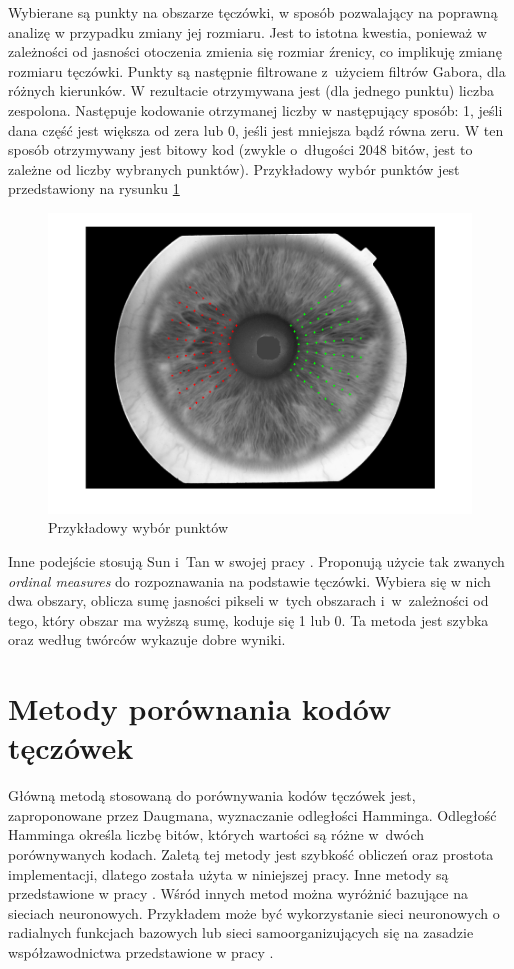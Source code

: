 Wybierane są punkty na obszarze tęczówki, w sposób pozwalający na poprawną analizę w przypadku zmiany jej rozmiaru. Jest to istotna kwestia, ponieważ w zależności od jasności otoczenia zmienia się rozmiar źrenicy, co implikuję zmianę rozmiaru tęczówki. Punkty są następnie filtrowane z~użyciem filtrów Gabora, dla różnych kierunków. W rezultacie otrzymywana jest (dla jednego punktu) liczba zespolona. Następuje kodowanie otrzymanej liczby w następujący sposób: 1, jeśli dana część jest większa od zera lub 0, jeśli jest mniejsza bądź równa zeru. W ten sposób otrzymywany jest bitowy kod (zwykle o~długości 2048 bitów, jest to zależne od liczby wybranych punktów). Przykładowy wybór punktów jest przedstawiony na rysunku \ref{fig:przykladPunkty}

\begin{figure}
\begin{center}
\includegraphics[scale=0.5]{punkty.png}
\caption{Przykładowy wybór punktów}
\label{fig:przykladPunkty}
\end{center}
\end{figure}

Inne podejście stosują Sun i~Tan w swojej pracy \cite{TaSu09}. Proponują użycie tak zwanych \emph{ordinal measures} do rozpoznawania na podstawie tęczówki. Wybiera się w nich dwa obszary, oblicza sumę jasności pikseli w~tych obszarach i~w~zależności od tego, który obszar ma wyższą sumę, koduje się 1 lub 0. Ta metoda jest szybka oraz według twórców wykazuje dobre wyniki.

\section{Metody porównania kodów tęczówek}
\label{sec:metodyPorownaniaKodow}
Główną metodą stosowaną do porównywania kodów tęczówek jest, zaproponowane przez Daugmana, wyznaczanie odległości Hamminga. Odległość Hamminga określa liczbę bitów, których wartości są różne w~dwóch porównywanych kodach. Zaletą tej metody jest szybkość obliczeń oraz prostota implementacji, dlatego została użyta w niniejszej pracy. Inne metody są przedstawione w pracy \cite{Gl11}. Wśród innych metod można wyróżnić bazujące na sieciach neuronowych. Przykładem może być wykorzystanie sieci neuronowych o radialnych funkcjach bazowych lub sieci samoorganizujących się na zasadzie współzawodnictwa przedstawione w pracy \cite{TP11}.
